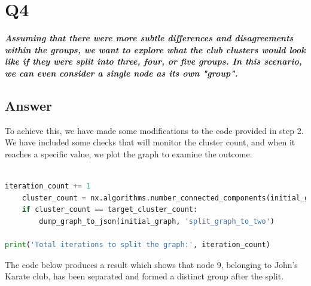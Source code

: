 \documentclass[12pt]{article}
\begin{document}
\section*{Q4}

\emph{ \textbf{Assuming that there were more subtle differences and disagreements within the groups, we want to explore what the club clusters would look like if they were split into three, four, or five groups. In this scenario, we can even consider a single node as its own "group".}}

\subsection*{Answer}
To achieve this, we have made some modifications to the code provided in step 2. We have included some checks that will monitor the cluster count, and when it reaches a specific value, we plot the graph to examine the outcome.
\\

\begin{lstlisting}[language=Python, caption=Generate a graph for various cluster sizes] 

iteration_count += 1
    cluster_count = nx.algorithms.number_connected_components(initial_graph)
    if cluster_count == target_cluster_count:
        dump_graph_to_json(initial_graph, 'split_graph_to_two')

print('Total iterations to split the graph:', iteration_count)

\end{lstlisting}

The code below produces a result which shows that node 9, belonging to John's Karate club, has been separated and formed a distinct group after the split.
\end{document}
